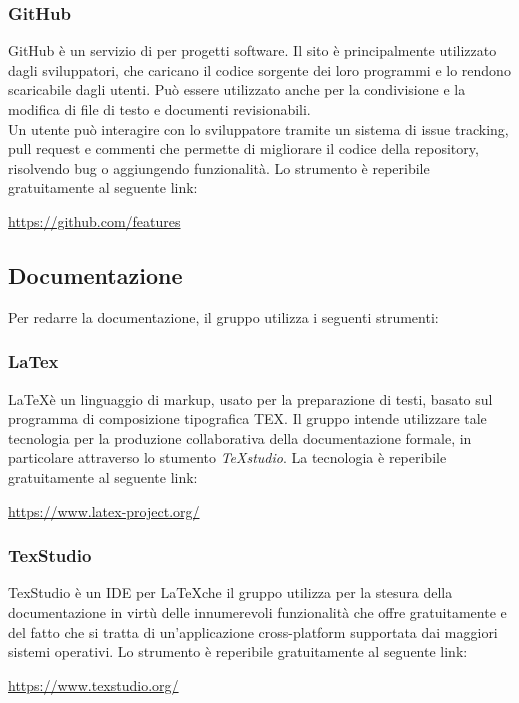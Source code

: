 \documentclass[../NormediProgetto.tex]{subfiles}
\begin{document}
	\subsubsection{GitHub}
	
	GitHub è un servizio di  per progetti software. Il sito è principalmente utilizzato dagli sviluppatori, che caricano il codice sorgente dei loro programmi e lo rendono scaricabile dagli utenti. Può essere utilizzato anche per la condivisione e la modifica di file di testo e documenti revisionabili.
	\\ \noindent Un utente può interagire con lo sviluppatore tramite un sistema di issue tracking, pull request e commenti che permette di migliorare il codice della repository, risolvendo bug o aggiungendo funzionalità. Lo strumento è reperibile gratuitamente al seguente link:
	\begin{center}
		\url{https://github.com/features}
	\end{center}
	
	
	\subsection{Documentazione}
	
	Per redarre la documentazione, il gruppo utilizza i seguenti strumenti:
	
	\subsubsection{LaTex}
	\LaTeX è un linguaggio di markup, usato per la preparazione di testi, basato sul programma di composizione tipografica TEX. Il gruppo intende utilizzare tale tecnologia per la produzione collaborativa della documentazione formale, in particolare attraverso lo stumento \textit{TeXstudio}. La tecnologia è reperibile gratuitamente al seguente link:
	\begin{center}
		\url{https://www.latex-project.org/}
	\end{center}
		
	\subsubsection{TexStudio}
	TexStudio è un IDE per \LaTeX che il gruppo utilizza per la stesura della documentazione in virtù delle innumerevoli funzionalità che offre gratuitamente e del fatto che si tratta di un'applicazione cross-platform supportata dai maggiori sistemi operativi. Lo strumento è reperibile gratuitamente al seguente link:
	\begin{center}
		\url{https://www.texstudio.org/}
	\end{center}
		
\end{document}
